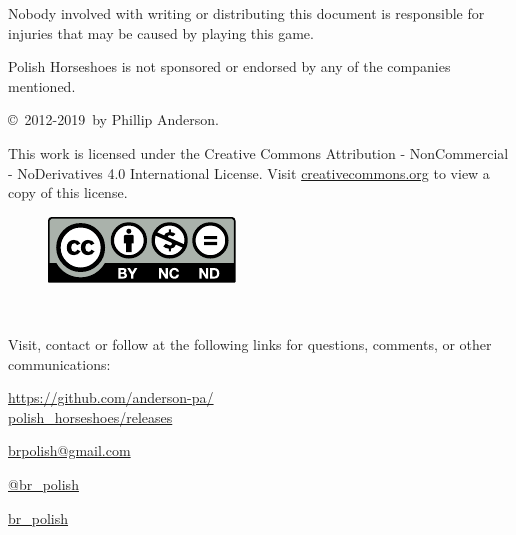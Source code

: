 \documentclass[11pt,letterpaper,twocolumn,english,DIV=calc]{scrartcl}
\newcommand{\currentyear}{2019}
\begin{document}

Nobody involved with writing or distributing this document is responsible for injuries that may be caused by playing this game.

\medskip{}\noindent Polish Horseshoes is not sponsored or endorsed by any of the companies mentioned.


\copyright\ 2012-\currentyear\ by Phillip Anderson. 

\noindent This work is licensed under the Creative Commons Attribution
- NonCommercial - NoDerivatives 4.0 International License. 
Visit \href{http://creativecommons.org/licenses/by-nc-nd/4.0/}{creativecommons.org} to view a copy of this license.

\begin{figure}[!h]
	\includegraphics[width=\columnwidth]{images/by-nc-nd}
\end{figure}

\newpage{}

\ \vfill{}

\noindent Visit, contact or follow at the following links for questions, comments, or other communications:

\begin{description}[listparindent=1.cm, font=\normalfont]
	\item[{\faGlobe}] \href{https://github.com/anderson-pa/polish_horseshoes/releases}{https://github.com/anderson-pa/\\\indent polish\_horseshoes/releases}

	\item[\faEnvelopeO] \href{mailto:brpolish@gmail.com}{brpolish@gmail.com}

	\item[\faTwitter] \href{http://www.twitter.com/br_polish}{@br\_{}polish}

	\item[\faTwitch] \href{http://www.twitch.tv/br_polish}{br\_{}polish}
\end{description}
\end{document}
